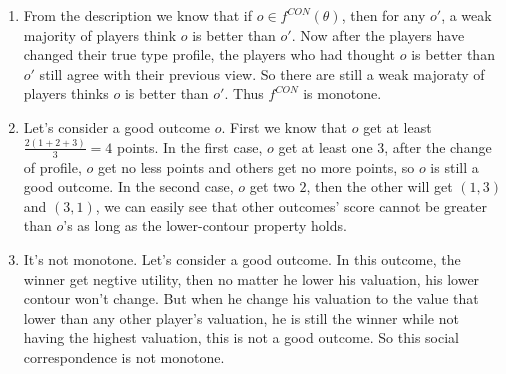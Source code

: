 \documentclass[12pt]{cgtmd}
\begin{document}

\begin{enumerate}
    \item From the description we know that if $o \in f^{CON}(\theta)$, then for any $o'$, a weak majority of players think $o$ is better than $o'$. Now after the players have changed their true type profile, the players who had thought $o$ is better than $o'$ still agree with their previous view. So there are still a weak majoraty of players thinks $o$ is better than $o'$. Thus $f^{CON}$ is monotone.
    \item Let's consider a good outcome $o$. First we know that $o$ get at least $\frac{2(1 + 2 + 3)}{3} = 4$ points. In the first case, $o$ get at least one $3$, after the change of profile, $o$ get no less points and others get no more points, so $o$ is still a good outcome. In the second case, $o$ get two $2$, then the other will get $(1, 3)$ and $(3, 1)$, we can easily see that other outcomes' score cannot be greater than $o$'s as long as the lower-contour property holds.
    \item It's not monotone. Let's consider a good outcome. In this outcome, the winner get negtive utility, then no matter he lower his valuation, his lower contour won't change. But when he change his valuation to the value that lower than any other player's valuation, he is still the winner while not having the highest valuation, this is not a good outcome. So this social correspondence is not monotone.
\end{enumerate}
\end{document}

